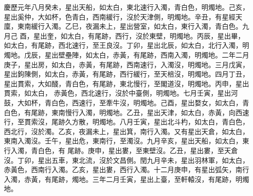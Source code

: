 \begin{pinyinscope}
 慶歷元年八月癸未，星出天船，如太白，東北速行入濁，青白色，明燭地。己亥，星出奚仲，大如杯，色青白，西南緩行，沒於天津側，明燭地。辛丑，有星經天廩，東南緩行入濁。乙巳，夜漏未上，星出營室，如太白，東行入濁，青白色。九月己
 酉，星出奎，如太白，有尾跡，西行，沒於東壁，明燭地。丙辰，星出畢，如太白，有尾跡，西北速行，至王良沒。丁卯，星出北辰，如太白，北行入濁，明燭地。戊辰，星出壁壘陣，如太白，赤黃，有尾跡，西南入濁，明燭地。二年二月庚子，星出房，如太白，赤黃，有尾跡，西南速行，入濁沒，明燭地。三月戊寅，星出鉤陳側，如太白，赤黃，有尾跡，西行緩行，至天棓沒，明燭地。四月丁丑，星出貫索，大如醆，青白色，有尾跡，東北慢行，至閣道沒，明燭地。丙申，星出貫索，如太白，
 赤黃色，西北速行，沒於中臺側，明燭地。七月壬寅，星出河鼓，大如杯，青白色，西速行，至牽牛沒，明燭地。己酉，星出婺女，如太白，青白色，有尾跡，東南慢行入濁，明燭地。乙丑，星出天津，如太白，赤黃，向西速行，至貫索沒，尾跡久方散，明燭地。八月壬寅，星出北斗杓，如太白，青白色，西北行，沒於濁。乙亥，夜漏未上，星出箕，南行入濁。又有星出天倉，如太白，東南入濁沒。壬午，星出危，東南行，至濁沒。九月辛亥，星出天船，如太白，東行入濁，青白色，有
 尾跡。庚申，星出婁，至東壁沒。乙丑，星出婁，至天倉沒。丁卯，星出五車，東北流，沒於文昌側。閏九月辛未，星出羽林軍，如太白，赤黃色，西南行入濁。乙亥，星出婁，西行入濁。十二月庚申，有星出弧矢，南行入濁，赤黃，有尾跡，燭地。三年二月壬寅，星出上臺，至軒轅沒，有尾跡，明燭地。




\end{pinyinscope}
